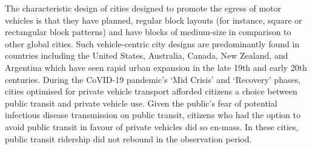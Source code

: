 \documentclass[preprint,12pt]{elsarticle}
\begin{document}
The characteristic design of cities designed to promote the egress of motor vehicles is that they have planned, regular block layouts (for instance, square or rectangular block patterns) and have blocks of medium-size in comparison to other global cities\cite{Thompson2020}. Such vehicle-centric city designs are predominantly found in countries including the United States, Australia, Canada, New Zealand, and Argentina which have seen rapid urban expansion in the late 19th and early 20th centuries. During the CoVID-19 pandemic's `Mid Crisis' and `Recovery' phases, cities optimised for private vehicle transport afforded citizens a choice between public transit and private vehicle use. Given the public's fear of potential infectious disease transmission on public transit\cite{fernando2023shaping}, citizens who had the option to avoid public transit in favour of private vehicles did so en-mass. In these cities, public transit ridership did not rebound in the observation period. 
\end{document}
